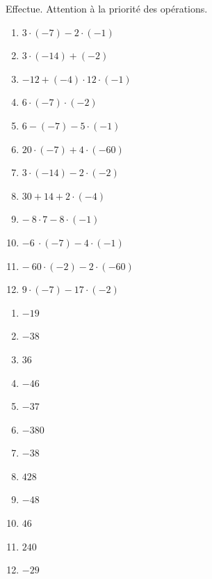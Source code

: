 \documentclass[../../syllabus_1.tex]{subfiles}
\begin{document}
\begin{exercise}
    Effectue. Attention à la priorité des opérations.
    \begin{enumerate}[itemsep=.4cm, cols=3]
        \item \(3 \cdot ( - 7) - 2 \cdot ( - 1) \)
        \item \(3 \cdot ( - 14) + ( - 2) \)
        \item \(-12 + ( - 4) \cdot 12 \cdot ( - 1) \)
        \item \(6 \cdot ( - 7) \cdot (-2) \)
        \item \(6 - ( - 7) - 5 \cdot ( - 1) \)
        \item \(20 \cdot ( - 7) + 4 \cdot ( - 60) \)
        \item \(3 \cdot ( - 14) - 2 \cdot ( - 2) \)
        \item \(30 + 14 + 2 \cdot ( - 4) \)
        \item \(- \ 8 \cdot 7 - 8 \cdot ( - 1) \)
        \item \(- 6\  \cdot ( - 7) - 4 \cdot ( - 1) \)
        \item \(- \ 60 \cdot ( - 2) - 2 \cdot ( - 60) \)
        \item \(9 \cdot ( - 7) - 17 \cdot ( - 2) \)
    \end{enumerate}
\end{exercise}
\begin{solution}
    \begin{enumerate}[cols=4]
        \item \(-19\)
        \item \(-38\)
        \item \(36\)
        \item \(-46\)
        \item \(-37\)
        \item \(-380\)
        \item \(-38\)
        \item \(428\)
        \item \(-48\)
        \item \(46\)
        \item \(240\)
        \item \(-29\)
    \end{enumerate}
\end{solution}
\end{document}
